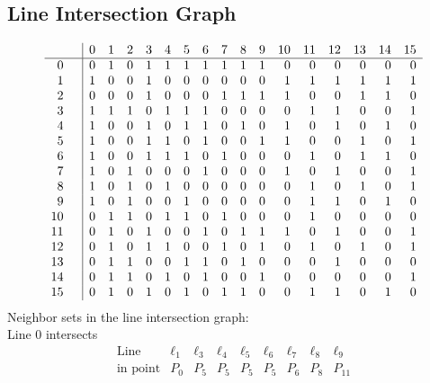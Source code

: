 \documentclass{article}
\begin{document}
{\subsection*{Line Intersection Graph}
{\arraycolsep=1pt
$$
\begin{array}{rr|*{16}r}
 &  & 0 & 1 & 2 & 3 & 4 & 5 & 6 & 7 & 8 & 9 & 10 & 11 & 12 & 13 & 14 & 15\\
\hline
0 &  & 0 & 1 & 0 & 1 & 1 & 1 & 1 & 1 & 1 & 1 & 0 & 0 & 0 & 0 & 0 & 0\\
1 &  & 1 & 0 & 0 & 1 & 0 & 0 & 0 & 0 & 0 & 0 & 1 & 1 & 1 & 1 & 1 & 1\\
2 &  & 0 & 0 & 0 & 1 & 0 & 0 & 0 & 1 & 1 & 1 & 1 & 0 & 0 & 1 & 1 & 0\\
3 &  & 1 & 1 & 1 & 0 & 1 & 1 & 1 & 0 & 0 & 0 & 0 & 1 & 1 & 0 & 0 & 1\\
4 &  & 1 & 0 & 0 & 1 & 0 & 1 & 1 & 0 & 1 & 0 & 1 & 0 & 1 & 0 & 1 & 0\\
5 &  & 1 & 0 & 0 & 1 & 1 & 0 & 1 & 0 & 0 & 1 & 1 & 0 & 0 & 1 & 0 & 1\\
6 &  & 1 & 0 & 0 & 1 & 1 & 1 & 0 & 1 & 0 & 0 & 0 & 1 & 0 & 1 & 1 & 0\\
7 &  & 1 & 0 & 1 & 0 & 0 & 0 & 1 & 0 & 0 & 0 & 1 & 0 & 1 & 0 & 0 & 1\\
8 &  & 1 & 0 & 1 & 0 & 1 & 0 & 0 & 0 & 0 & 0 & 0 & 1 & 0 & 1 & 0 & 1\\
9 &  & 1 & 0 & 1 & 0 & 0 & 1 & 0 & 0 & 0 & 0 & 0 & 1 & 1 & 0 & 1 & 0\\
10 &  & 0 & 1 & 1 & 0 & 1 & 1 & 0 & 1 & 0 & 0 & 0 & 1 & 0 & 0 & 0 & 0\\
11 &  & 0 & 1 & 0 & 1 & 0 & 0 & 1 & 0 & 1 & 1 & 1 & 0 & 1 & 0 & 0 & 1\\
12 &  & 0 & 1 & 0 & 1 & 1 & 0 & 0 & 1 & 0 & 1 & 0 & 1 & 0 & 1 & 0 & 1\\
13 &  & 0 & 1 & 1 & 0 & 0 & 1 & 1 & 0 & 1 & 0 & 0 & 0 & 1 & 0 & 0 & 0\\
14 &  & 0 & 1 & 1 & 0 & 1 & 0 & 1 & 0 & 0 & 1 & 0 & 0 & 0 & 0 & 0 & 1\\
15 &  & 0 & 1 & 0 & 1 & 0 & 1 & 0 & 1 & 1 & 0 & 0 & 1 & 1 & 0 & 1 & 0\\
\end{array}
$$
}%
Neighbor sets in the line intersection graph:\\
Line 0 intersects 
$$
\begin{array}{|r*{8}{|c}|}
\hline
\mbox{Line}  & \ell_{1} & \ell_{3} & \ell_{4} & \ell_{5} & \ell_{6} & \ell_{7} & \ell_{8} & \ell_{9}\\
\hline
\mbox{in point}  & P_{0} & P_{5} & P_{5} & P_{5} & P_{5} & P_{6} & P_{8} & P_{11}\\

\end{array}$$}
\end{document}
